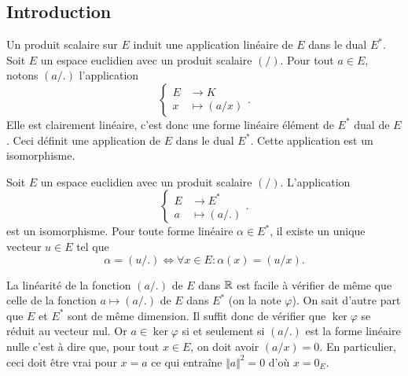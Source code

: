\subsection{Introduction}
Un produit scalaire sur $E$ induit une application linéaire de $E$ dans le dual $E^*$. Soit $E$ un espace euclidien avec un produit scalaire $(/)$. Pour tout $a\in E$, notons $(a/.)$ l'application 
\begin{displaymath}
 \left\lbrace 
\begin{aligned}
 E &\rightarrow K \\ x &\mapsto (a/x)
\end{aligned}
\right. .
\end{displaymath}
Elle est clairement linéaire, c'est donc une forme linéaire élément de $E^*$ dual de $E$. Ceci définit une application de $E$ dans le dual $E^*$.
Cette application est un isomorphisme. 
\begin{prop}
 Soit $E$ un espace euclidien avec un produit scalaire $(/)$. L'application
\begin{displaymath}
 \left\lbrace 
\begin{aligned}
  E &\rightarrow E^* \\ a &\mapsto (a/.)
\end{aligned}
\right. .
\end{displaymath}
est un isomorphisme. Pour toute forme linéaire $\alpha\in E^*$, il existe un unique vecteur $u\in E$ tel que
\begin{displaymath}
 \alpha = (u/ .)\Leftrightarrow
\forall x\in E : \alpha(x) = (u/x) .
\end{displaymath}
\end{prop}
\begin{demo}
 La linéarité de la fonction $(a/.)$ de $E$ dans $\mathbb{R}$ est facile à vérifier de même que celle de la fonction $a \mapsto (a/.)$ de $E$ dans $E^*$ (on la note $\varphi$). On sait d'autre part que $E$ et $E^*$ sont de même dimension. Il suffit donc de vérifier que $\ker \varphi$ se réduit au vecteur nul. Or $a\in\ker \varphi$ si et seulement si $(a/.)$ est la forme linéaire nulle c'est à dire que, pour tout $x\in E$, on doit avoir $(a/x)=0$. En particulier, ceci doit être vrai pour $x=a$ ce qui entraîne $\Vert a\Vert^2=0$ d'où $x=0_E$.
\end{demo}
\clearpage
